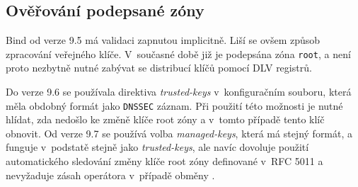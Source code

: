 \subsection{Ověřování podepsané zóny}
Bind od verze 9.5 má validaci zapnutou implicitně. Liší se ovšem způsob zpracování veřejného klíče. V~současné době již je podepsána zóna {\tt root}, a není proto nezbytně nutné zabývat se distribucí klíčů pomocí DLV registrů.

Do verze 9.6 se používala direktiva {\em trusted-keys} v~konfiguračním souboru, která měla obdobný formát jako {\tt DNSSEC} záznam. Při použití této možnosti je nutné hlídat, zda nedošlo ke změně klíče root zóny a v~tomto případě tento klíč obnovit. Od verze 9.7 se používá volba {\em managed-keys}, která má stejný formát, a funguje v~podstatě stejně jako {\em trusted-keys}, ale navíc dovoluje použití automatického sledování změny klíče root zóny definované v~RFC 5011 a nevyžaduje zásah operátora v~případě obměny \cite{RFC5011}.

%
